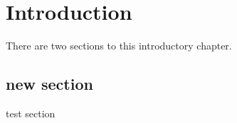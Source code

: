 \chapter{Introduction}
There are two sections to this introductory chapter.

\section{new section}

test section
